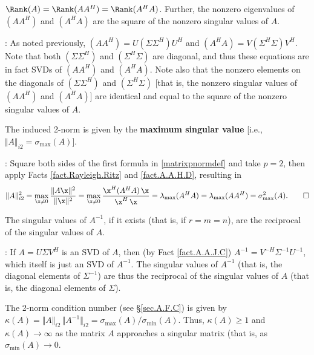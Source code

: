 \begin{fact} \label{fact.A.A.H.D}
    $\Rank(A)=\Rank(A A^{H})=\Rank(A^{H} A)$.  Further, the nonzero
    eigenvalues of $(A A^{H})$ and $(A^{H} A)$ are the square of
    the nonzero singular values of $A$.
\end{fact} 

\/: As noted previously, $(AA^{H}) = U ( \Sigma
\Sigma^{H} ) U^{H}$ and $(A^{H}A) = V (\Sigma^{H} \Sigma ) V^{H}$.  Note
that both $(\Sigma \Sigma^{H})$ and $(\Sigma^{H} \Sigma )$ are
diagonal, and thus these equations are in fact SVDs of $(AA^{H})$ and
$(A^{H}A)$.  Note also that the nonzero elements on the diagonals of
$(\Sigma \Sigma^{H})$ and $(\Sigma^{H} \Sigma )$ [that is, the nonzero
singular values of $(AA^{H})$ and $(A^{H}A)$] are identical and equal
to the square of the nonzero singular values of $A$. \endproof
\vskip0.1in

\begin{fact} \label{fact.induced2norm}
The induced 2-norm is given by the {\bf maximum singular value} [i.e., $\Vert A \Vert_{i2}=\sigma_{\textrm{max}}(A)$].
\end{fact}

\/:  Square both sides of the first formula in \eqref{matrixpnormdef} and take $p=2$, then apply Facts \ref{fact.Rayleigh.Ritz} and \ref{fact.A.A.H.D}, resulting in
\begin{equation}
\Vert A\Vert_{i2}^2 = \max_{\x\ne 0} \frac{\Vert A \x\Vert^2}{\Vert\x\Vert^2}
= \max_{\x\ne 0} \frac{\x^H (A^H A)\, \x}{\x^H\,\x} = \lambda_{\max}(A^H A) = \lambda_{\max}(A A^H) = \sigma_{\max}^2(A).
\tag*{$\Box$}
\end{equation}

\clearpage

\begin{fact} \label{fact.A.A.H.E}
    The singular values of $A^{-1}$, if it exists (that is, if $r=m=n$),
	are the reciprocal of the singular values of $A$.
\end{fact} 

\/: If $A=U\Sigma V^H$ is an SVD of $A$, then (by Fact \ref{fact.A.A.J.C}) $A^{-1}=V^{-H} \Sigma^{-1} U^{-1}$, which itself is
just an SVD of $A^{-1}$.  The singular values of $A^{-1}$ (that is, the diagonal elements of $\Sigma^{-1}$) are thus the reciprocal of 
the singular values of $A$ (that is, the diagonal elements of $\Sigma$).  \endproof \vskip0.1in

\begin{fact} \label{fact.2normconditionnumber}
The 2-norm condition number (see \S \ref{sec.A.F.C}) is given by $\kappa(A)=\Vert A \Vert_{i2}\,\Vert A^{-1} \Vert_{i2}=\sigma_{\textrm{max}}(A)/\sigma_{\textrm{min}}(A)$.
Thus, $\kappa(A)\ge 1$ and $\kappa(A)\rightarrow \infty$ as the matrix $A$ approaches a singular matrix
(that is, as $\sigma_{\textrm{min}}(A)\rightarrow 0$.
\end{fact}

